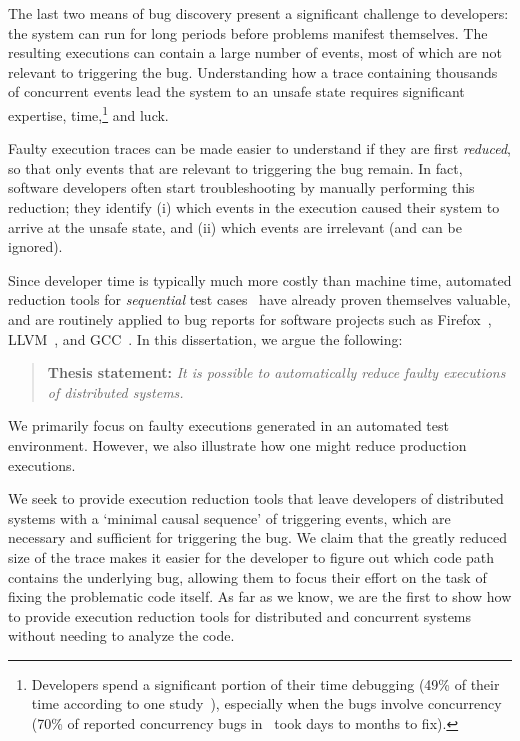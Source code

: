 The last two means of bug discovery present a significant challenge to
developers: the system can run for
long periods before problems manifest themselves. The resulting executions
can contain a large number of events, most of which are not relevant to triggering the
bug. Understanding how a trace containing thousands of concurrent events lead
the system to an unsafe state requires significant expertise, time,\footnote{Developers spend a significant portion of their time
debugging (49\% of their time according to one
study~\cite{LaToza:2006:MMM:1134285.1134355}), especially when the bugs
involve concurrency (70\% of reported concurrency bugs
in~\cite{msoft_concurrency} took days to months to fix).}
and luck.


Faulty execution traces can be made %
easier to understand if they are first
{\em reduced}, so that only events that are relevant to triggering the bug remain.
In fact, software developers often start troubleshooting by manually performing this
reduction; they identify
(i) which events in the execution caused their system to arrive at the unsafe
state, and (ii) which events are irrelevant (and can be ignored).

Since developer time is typically much more costly than machine time,
automated reduction tools for {\em sequential}
test
cases~\cite{claessen2000quickcheck,Zeller:2002:SIF:506201.506206,yang2011finding}
have already proven themselves valuable,
and are routinely applied to bug reports for software projects such as Firefox~\cite{firefox_reduction}, LLVM~\cite{bugpoint}, and GCC~\cite{gcc_reduction}.
In this dissertation, we argue the following:

\begin{quote}
{\textbf{Thesis statement:}} \textit{It is possible to automatically reduce faulty
executions of distributed systems.}
\end{quote}

\noindent We primarily
focus on faulty executions generated in an automated test environment. However, we also
illustrate how one might reduce production executions.

We seek to provide execution reduction tools that leave developers of
distributed systems with a `minimal causal sequence' of triggering events,
which are necessary and sufficient for triggering the bug.
We claim that the greatly reduced size of the trace makes it easier for the developer to figure out which code path contains the underlying bug, allowing them to focus their effort on the task of fixing the problematic code itself.
As far as we know, we are the first to show how to provide execution
reduction tools
for distributed and concurrent systems without needing to analyze the code.

